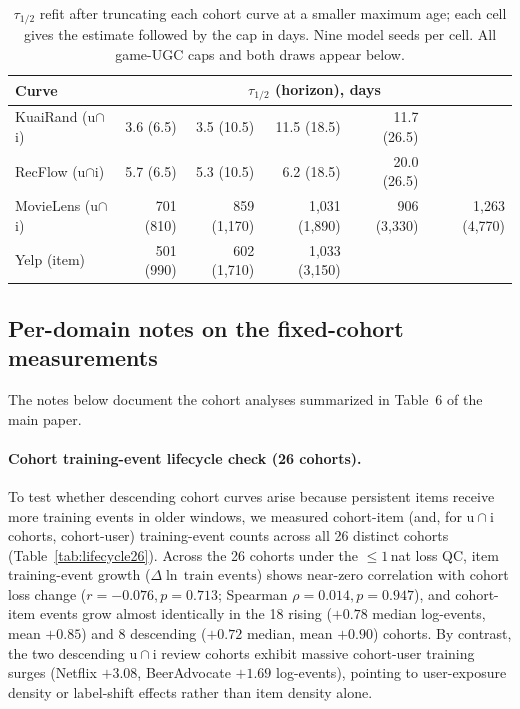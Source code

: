 \documentclass[10pt,letterpaper]{article}
\begin{document}
\begin{table}[t]
\centering
\caption{$\tau_{1/2}$ refit after truncating each cohort curve at a smaller
maximum age; each cell gives the estimate followed by the cap in days.
Nine model seeds per cell. All game-UGC caps and both draws appear below.}
\label{tab:trunc}
\small
\begin{tabular}{lrrrrr}
\toprule
Curve & \multicolumn{5}{c}{$\tau_{1/2}$ (horizon), days} \\
\midrule
KuaiRand (u${\cap}$i) & 3.6 (6.5) & 3.5 (10.5) & 11.5 (18.5) & 11.7 (26.5) & \\
RecFlow (u${\cap}$i) & 5.7 (6.5) & 5.3 (10.5) & 6.2 (18.5) & 20.0 (26.5) & \\
MovieLens (u${\cap}$i) & 701 (810) & 859 (1{,}170) & 1{,}031 (1{,}890) & 906 (3{,}330) & 1{,}263 (4{,}770) \\
Yelp (item) & 501 (990) & 602 (1{,}710) & 1{,}033 (3{,}150) & & \\
\bottomrule
\end{tabular}
\end{table}

\subsection{Per-domain notes on the fixed-cohort measurements}

The notes below document the cohort analyses summarized in Table~6 of the main paper.

\paragraph{Cohort training-event lifecycle check (26 cohorts).}
To test whether descending cohort curves arise because persistent items
receive more training events in older windows, we measured cohort-item (and,
for $\mathrm{u}{\cap}\mathrm{i}$ cohorts, cohort-user) training-event counts
across all 26 distinct cohorts (Table~\ref{tab:lifecycle26}). Across the 26
cohorts under the $\le 1$\,nat loss QC, item training-event growth
($\Delta\ln\,\text{train events}$) shows near-zero correlation with cohort loss
change ($r = -0.076, p = 0.713$; Spearman $\rho = 0.014, p = 0.947$), and
cohort-item events grow almost identically in the 18 rising ($+0.78$ median
log-events, mean $+0.85$) and 8 descending ($+0.72$ median, mean $+0.90$)
cohorts. By contrast, the two descending $\mathrm{u}{\cap}\mathrm{i}$ review
cohorts exhibit massive cohort-user training surges (Netflix $+3.08$,
BeerAdvocate $+1.69$ log-events), pointing to user-exposure density or
label-shift effects rather than item density alone.
\end{document}
